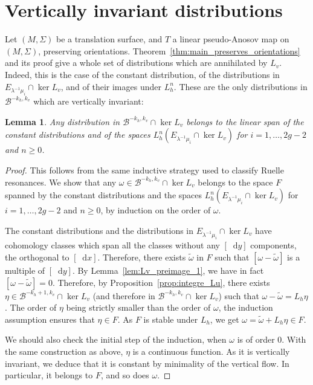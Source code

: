 \documentclass[JEP,XML,SOM,Unicode]{cedram}
\newcommand{\boB}{\mathcal{B}}
\newcommand{\dd}{\mathop{}\!\mathrm{d}}
\newtheorem{lem}[thm]{Lemma}
\theoremstyle{definition}
\numberwithin{equation}{section}
\begin{document}
\section{Vertically invariant distributions}
\label{sec:vertically_invariant}

Let $(M,\Sigma)$ be a translation surface, and $T$ a linear pseudo-Anosov map
on $(M,\Sigma)$, preserving orientations.
Theorem~\ref{thm:main_preserves_orientations} and its proof give a whole set
of distributions which are annihilated by $L_v$. Indeed, this is the case of
the constant distribution, of the distributions in $E_{\lambda^{-1}\mu_i}
\cap \ker L_v$, and of their images under $L_h^n$. These are the only
distributions in $\boB^{-k_h, k_v}$ which are vertically invariant:

\begin{lem}
\label{lem:Lv_invariant_boB} Any distribution in $\boB^{-k_h, k_v} \cap \ker
L_v$ belongs to the linear span of the constant distributions and of the
spaces $L_h^n(E_{\lambda^{-1}\mu_i} \cap \ker L_v)$ for $i=1,\dotsc, 2g-2$
and $n\geq 0$.
\end{lem}
\begin{proof}
This follows from the same inductive strategy used to classify Ruelle
resonances. We show that any $\omega \in \boB^{-k_h, k_v} \cap \ker L_v$
belongs to the space $F$ spanned by the constant distributions and the spaces
$L_h^n(E_{\lambda^{-1}\mu_i} \cap \ker L_v)$ for $i=1,\dotsc, 2g-2$ and
$n\geq 0$, by induction on the order of $\omega$.

The constant distributions and the distributions in $E_{\lambda^{-1}\mu_i}
\cap \ker L_v$ have cohomology classes which span all the classes without any
$[\dd y]$ components, \ie the orthogonal to $[\dd x]$. Therefore, there
exists $\tilde \omega$ in $F$ such that $[\omega - \tilde \omega]$ is a
multiple of $[\dd y]$. By Lemma~\ref{lem:Lv_preimage_1}, we have in fact
$[\omega - \tilde \omega] = 0$. Therefore, by
Proposition~\ref{prop:integre_Lu}, there exists $\eta \in \boB^{-k_h+1, k_v}
\cap \ker L_v$ (and therefore in $\boB^{-k_h, k_v} \cap \ker L_v$) such that
$\omega-\tilde \omega = L_h \eta$. The order of $\eta$ being strictly smaller
than the order of $\omega$, the induction assumption ensures that $\eta \in
F$. As $F$ is stable under $L_h$, we get $\omega = \tilde \omega + L_h \eta
\in F$.

We should also check the initial step of the induction, when $\omega$ is of
order $0$. With the same construction as above, $\eta$ is a continuous
function. As it is vertically invariant, we deduce that it is constant by
minimality of the vertical flow. In particular, it belongs to $F$, and so
does $\omega$.
\end{proof}
\end{document}
